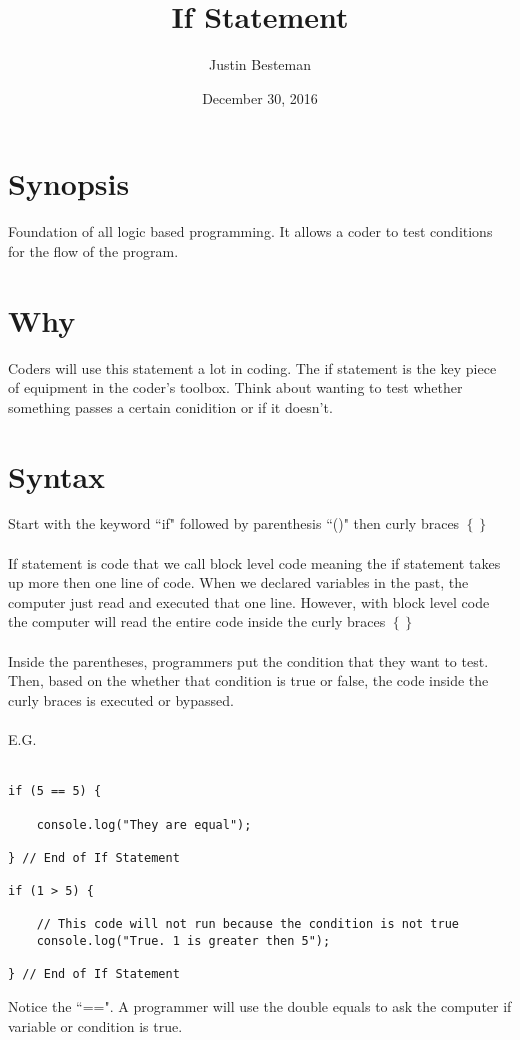\documentclass[12pt, letterpaper]{article}
\title{If Statement}
\author{Justin Besteman}
\date{December 30, 2016}
\begin{document}
\maketitle


\section*{Synopsis}

Foundation of all logic based programming. It allows a coder to test conditions for the flow of the program.

\section*{Why}

Coders will use this statement a lot in coding. The if statement is the key piece of equipment in the coder's toolbox. Think about wanting to test whether something passes a certain conidition or if it doesn't.

\section*{Syntax}

Start with the keyword ``if" followed by parenthesis ``()" then curly braces $\left\{\right\}$ \\ \\
If statement is code that we call block level code meaning the if statement takes up more then one line of code. When we declared variables in the past, the computer just read and executed that one line. However, with block level code the computer will read the entire code inside the curly braces $\left\{\right\}$ \\ \\
Inside the parentheses, programmers put the condition that they want to test. Then, based on the whether that condition is true or false, the code inside the curly braces is executed or bypassed. \\ \\
E.G.\\ \\
\begin{lstlisting}
if (5 == 5) {

	console.log("They are equal");

} // End of If Statement

if (1 > 5) {

	// This code will not run because the condition is not true
	console.log("True. 1 is greater then 5");

} // End of If Statement
\end{lstlisting}
Notice the  ``==". A programmer will use the double equals to ask the computer if variable or condition is true. 
\end{document}
